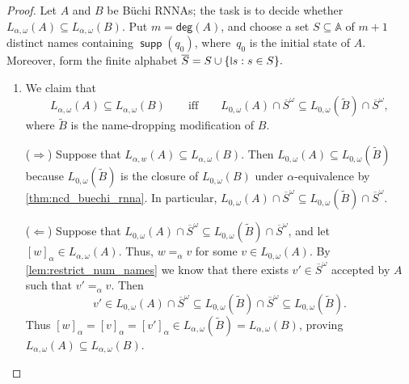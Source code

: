 \documentclass[final,a4paper,UKenglish,thm-restate,autoref,numberwithinsect]{lipics-v2021}
\newcommand{\midmid}{\hspace{0.2ex}{\rule[-0.1ex]{0.6pt}{1.65ex}}\hspace{0.2ex}}
\newcommand{\compr}{:}
\newcommand{\newletter}[1]{{\midmid}#1}
\newcommand{\degree}{\mathsf{deg}}
\numberwithin{equation}{section}
\newcommand{\ol}{\overline}
\newcommand{\seq}{\subseteq}
\newcommand{\tl}{\widetilde}
\newcommand{\+}[1]{\mathcal{#1}\xspace}
\newcommand{\names}{\mathbb{A}}
\DeclareMathOperator{\supp}{\mathsf{supp}} %
\theoremstyle{definition}
\begin{document}
\begin{proof}
  Let $A$ and $B$ be Büchi RNNAs; the task is to decide whether $L_{\alpha,\omega}(A)\seq L_{\alpha,\omega}(B)$. Put $m=\degree(A)$, and choose a set
  $S\seq \names$ of $m+1$ distinct names containing $\supp(q_{0})$, where~$q_0$ is the initial state of $A$. Moreover,
 form the finite alphabet
$
    \ol{S}=S\cup \{\newletter s\compr s\in S\}.
$ 
  \begin{enumerate}
  \item We claim that
    \begin{equation}\label{eq:acc_equiv} L_{\alpha,\omega}(A)\seq
      L_{\alpha,\omega}(B)\qquad\text{iff}\qquad L_{0,\omega}(A)\cap
      \ol{S}^\omega \seq L_{0,\omega}(\tl{B})\cap
      \ol{S}^\omega, \end{equation}
    where $\tl{B}$ is the name-dropping modification of $B$.

    \smallskip\noindent ($\Rightarrow$) Suppose that
    $L_{\alpha,w}(A)\seq L_{\alpha,\omega}(B)$. Then
    $L_{0,\omega}(A)\seq L_{0,\omega}(\tl{B})$ because
    $L_{0,\omega}(\tl{B})$ is the closure of $L_{0,\omega}(B)$ under
    $\alpha$-equivalence by \autoref{thm:ncd_buechi_rnna}. In
    particular,
    $L_{0,\omega}(A)\cap \ol{S}^\omega \seq L_{0,\omega}(\tl{B})\cap
    \ol{S}^\omega$.

    \smallskip\noindent ($\Leftarrow$) Suppose that
    $L_{0,\omega}(A)\cap \ol{S}^\omega \seq L_{0,\omega}(\tl{B})\cap
    \ol{S}^\omega$, and let $[w]_\alpha \in
    L_{\alpha,\omega}(A)$. Thus, $w=_\alpha v$ for some
    $v\in L_{0,\omega}(A)$. By \autoref{lem:restrict_num_names} we
    know that there exists $v'\in \ol{S}^\omega$ accepted by $A$ such
    that $v'=_\alpha v$. Then
    \[
      v'\in L_{0,\omega}(A)\cap \ol{S}^\omega \seq
      L_{0,\omega}(\tl{B})\cap \ol{S}^\omega \seq
      L_{0,\omega}(\tl{B}).
    \]
    Thus
    $[w]_\alpha=[v]_\alpha = [v']_\alpha \in
    L_{\alpha,\omega}(\tl{B})=L_{\alpha,\omega}(B)$, proving
    $L_{\alpha,\omega}(A)\seq L_{\alpha,\omega}(B)$.


\end{enumerate}
\end{proof}
\end{document}
